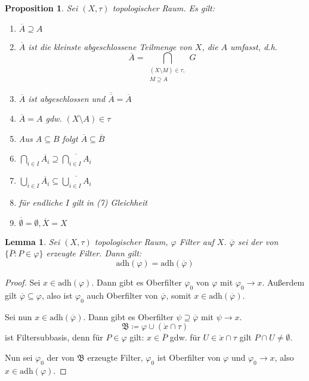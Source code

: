 \documentclass[12pt]{scrartcl}%
\newtheorem{prop}{Proposition}
\newtheorem{lemma}{Lemma}
\theoremstyle{definition}
\theoremstyle{remark}
\newcommand{\adh}{\text{adh}}
\begin{document}
\begin{prop}
    Sei $(X,\tau)$ topologischer Raum. Es gilt:

    \begin{enumerate}[label=(\arabic*)]
        \item $\overline{A} \supseteq A$
        \item $\overline{A}$ ist die kleinste abgeschlossene Teilmenge von $X$, die $A$ umfasst, d.h. $$\overline{A} = \bigcap_{\substack{(X\setminus M) \in \tau, \\  M\supseteq A}} G$$
        \item $\overline{A}$ ist abgeschlossen und $\overline{\overline{A}}=\overline{A}$
        \item $\overline{A}=A$ gdw. $(X\setminus A) \in \tau$
        \item Aus $A\subseteq B$ folgt $\overline{A}\subseteq \overline{B}$
        \item $\bigcap_{i\in I} \overline{A_i} \supseteq \overline{\bigcap_{i\in I} A_i}$
        \item $\bigcup_{i\in I} \overline{A_i} \subseteq \overline{\bigcup_{i\in I} A_i}$
        \item für endliche $I$ gilt in (7) Gleichheit
        \item $\overline{\emptyset}=\emptyset, \overline{X}=X$
    \end{enumerate}
\end{prop}

\begin{lemma}
    Sei $(X,\tau)$ topologischer Raum, $\varphi$ Filter auf $X$. $\overline{\varphi}$ sei der von $\{ \overline{P}: P\in \varphi \}$ erzeugte Filter. Dann gilt: $$\adh(\varphi) = \adh(\overline{\varphi})$$
\end{lemma}

\begin{proof}
    Sei $x\in \adh(\varphi)$. Dann gibt es Oberfilter $\varphi_0$ von $\varphi$ mit $\varphi_0\to x$. Außerdem gilt $\overline{\varphi} \subseteq \varphi$, also ist $\varphi_0$ auch Oberfilter von $\overline{\varphi}$, somit $x\in \adh(\overline{\varphi})$.

    Sei nun $x\in \adh(\overline{\varphi})$. Dann gibt es Oberfilter $\psi\supseteq \overline{\varphi}$ mit $\psi \to x$. $$\mathfrak{B} \coloneqq \varphi \cup (\dot x \cap \tau)$$ ist Filtersubbasis, denn für $P\in \varphi$ gilt: $x\in \overline{P}$ gdw. für $U\in \dot x \cap \tau$ gilt $P\cap U \neq \emptyset$.

    Nun sei $\varphi_0$ der von $\mathfrak{B}$ erzeugte Filter, $\varphi_0$ ist Oberfilter von $\varphi$ und $\varphi_0 \to x$, also $x\in \adh(\varphi)$.
\end{proof}
\end{document}
